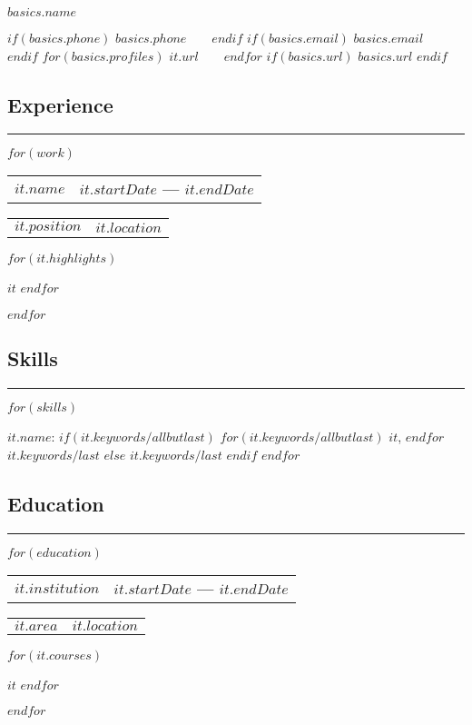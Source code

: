 \documentclass[10pt,letterpaper]{article}
\makeatletter
\newenvironment{indentsection}[1]%
{\begin{list}{}%
	{\setlength{\leftmargin}{#1}}%
	\item[]%
}
{\end{list}}
\def\sectionSpace{\vspace{-10pt}}
\newcommand\resumesection[1]
{\subsection*{#1}
\vspace{-0.2em}
\hrule
\vspace{0.4em}}
\newcommand\headerrow[2]
{\begin{tabular*}{\linewidth}{l@{\extracolsep{\fill}}r}
    #1 &
	#2 \\
\end{tabular*}}
\makeatother
\begin{document}
\begin{center}
{\LARGE \textbf{$basics.name$}}
\vspace{0.4em}

$if(basics.phone)$
    $basics.phone$\ \
    \textbullet \ \
$endif$
$if(basics.email)$
    \href{mailto:$basics.email$}{$basics.email$}\ \
    \textbullet \ \
$endif$
$for(basics.profiles)$
    \href{https://$it.url$}{$it.url$}\ \
    \textbullet \ \
$endfor$
$if(basics.url)$
    \href{https://$basics.url$}{$basics.url$}
$endif$
\end{center}
\vspace{-16pt}

\resumesection{Experience}

    $for(work)$
    \headerrow
		{\textbf{$it.name$}}
		{\textbf{$it.startDate$ — $it.endDate$}}
	\vspace{-4pt}
	\headerrow
        {$it.position$}
		{$it.location$}
	\begin{itemize*}
        $for(it.highlights)$
	    \item $it$
        $endfor$
	\end{itemize*}
	\vspace{-2pt}
    $endfor$
    \sectionSpace

\resumesection{Skills}

	\begin{indentsection}{\parindent}
	\begin{description*}
        $for(skills)$
		\item[$it.name$:]
            $if(it.keywords/allbutlast)$
                $for(it.keywords/allbutlast)$
                    $it$,
                $endfor$
                $it.keywords/last$
            $else$
                $it.keywords/last$
            $endif$
        $endfor$
	\end{description*}
	\end{indentsection}
	\sectionSpace

\resumesection{Education}

    $for(education)$
	\headerrow
		{\textbf{$it.institution$}}
		{\textbf{$it.startDate$ — $it.endDate$}}
	\vspace{-5pt}
	\headerrow
		{$it.area$}
		{$it.location$}
    \begin{itemize*}
        $for(it.courses)$
        \item $it$
        $endfor$
    \end{itemize*}
	\vspace{-2pt}
    $endfor$
	\sectionSpace
\end{document}
